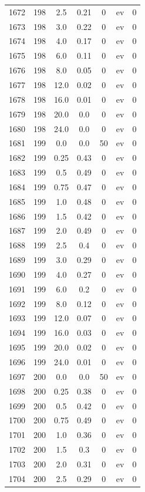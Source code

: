 \documentclass[12pt,a4paper]{article}
\begin{document}
\begin{tabular}{r|cccccc}
	1672 & 198 & 2.5 & 0.21 & 0 & ev & 0 \\
	1673 & 198 & 3.0 & 0.22 & 0 & ev & 0 \\
	1674 & 198 & 4.0 & 0.17 & 0 & ev & 0 \\
	1675 & 198 & 6.0 & 0.11 & 0 & ev & 0 \\
	1676 & 198 & 8.0 & 0.05 & 0 & ev & 0 \\
	1677 & 198 & 12.0 & 0.02 & 0 & ev & 0 \\
	1678 & 198 & 16.0 & 0.01 & 0 & ev & 0 \\
	1679 & 198 & 20.0 & 0.0 & 0 & ev & 0 \\
	1680 & 198 & 24.0 & 0.0 & 0 & ev & 0 \\
	1681 & 199 & 0.0 & 0.0 & 50 & ev & 0 \\
	1682 & 199 & 0.25 & 0.43 & 0 & ev & 0 \\
	1683 & 199 & 0.5 & 0.49 & 0 & ev & 0 \\
	1684 & 199 & 0.75 & 0.47 & 0 & ev & 0 \\
	1685 & 199 & 1.0 & 0.48 & 0 & ev & 0 \\
	1686 & 199 & 1.5 & 0.42 & 0 & ev & 0 \\
	1687 & 199 & 2.0 & 0.49 & 0 & ev & 0 \\
	1688 & 199 & 2.5 & 0.4 & 0 & ev & 0 \\
	1689 & 199 & 3.0 & 0.29 & 0 & ev & 0 \\
	1690 & 199 & 4.0 & 0.27 & 0 & ev & 0 \\
	1691 & 199 & 6.0 & 0.2 & 0 & ev & 0 \\
	1692 & 199 & 8.0 & 0.12 & 0 & ev & 0 \\
	1693 & 199 & 12.0 & 0.07 & 0 & ev & 0 \\
	1694 & 199 & 16.0 & 0.03 & 0 & ev & 0 \\
	1695 & 199 & 20.0 & 0.02 & 0 & ev & 0 \\
	1696 & 199 & 24.0 & 0.01 & 0 & ev & 0 \\
	1697 & 200 & 0.0 & 0.0 & 50 & ev & 0 \\
	1698 & 200 & 0.25 & 0.38 & 0 & ev & 0 \\
	1699 & 200 & 0.5 & 0.42 & 0 & ev & 0 \\
	1700 & 200 & 0.75 & 0.49 & 0 & ev & 0 \\
	1701 & 200 & 1.0 & 0.36 & 0 & ev & 0 \\
	1702 & 200 & 1.5 & 0.3 & 0 & ev & 0 \\
	1703 & 200 & 2.0 & 0.31 & 0 & ev & 0 \\
	1704 & 200 & 2.5 & 0.29 & 0 & ev & 0 \\

\end{tabular}
\end{document}
